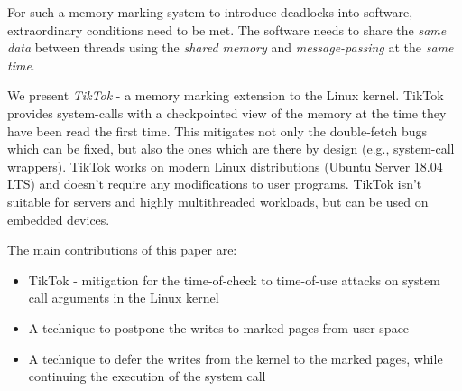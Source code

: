 For such a memory-marking system to introduce deadlocks into software,
extraordinary conditions need to be met. The software needs to
share the \emph{same data} between threads using the \emph{shared memory} and 
\emph{message-passing} at the \emph{same time}. 

We present \emph{TikTok} - a memory marking extension to the Linux kernel. TikTok
provides system-calls with a checkpointed view of the memory at the time they
have been read the first time. This mitigates not only the double-fetch bugs
which can be fixed, but also the ones which are there by design (e.g., system-call
wrappers). TikTok works on modern Linux distributions (Ubuntu Server 18.04 LTS)
and doesn't require any modifications to user programs. TikTok isn't suitable
for servers and highly multithreaded workloads, but can be used on embedded
devices.

The main contributions of this paper are:
\begin{itemize}
\item TikTok - mitigation for the time-of-check to time-of-use attacks on system 
      call arguments in the Linux kernel
\item A technique to postpone the writes to marked pages from user-space
\item A technique to defer the writes from the kernel to the marked pages,
      while continuing the execution of the system call
\end{itemize}




